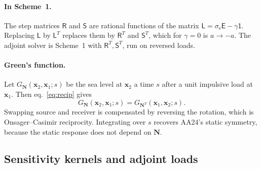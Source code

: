 \documentclass[11pt,a4paper]{article}
\newcommand{\bx}{\mathbf{x}}
\newcommand{\bN}{\mathbf{N}}
\newcommand{\E}{\mathsf{E}}
\newcommand{\Id}{\mathsf{1}}
\newcommand{\R}{\mathsf{R}}
\newcommand{\Sm}{\mathsf{S}}
\newcommand{\se}{\sigma_{\mathrm e}}
\begin{document}
\paragraph{In Scheme~1.} The step matrices $\R$ and $\Sm$ are rational functions of the matrix
$\mathsf{L}=\se\E-\gamma\Id$. Replacing $\mathsf{L}$ by $\mathsf{L}^T$ replaces them by $\R^T$ and
$\Sm^T$, which for $\gamma=0$ is $a\to-a$. The adjoint solver is Scheme~1 with $\R^T,\Sm^T$, run on
reversed loads.

\paragraph{Green's function.} Let $G_{\bN}(\bx_2,\bx_1;s)$ be the sea level at $\bx_2$ a time $s$ after
a unit impulsive load at $\bx_1$. Then eq.~\eqref{eq:recip} gives
\begin{equation}
  G_{\bN}(\bx_2,\bx_1;s)=G_{\bN^T}(\bx_1,\bx_2;s).
  \label{eq:green}
\end{equation}
Swapping source and receiver is compensated by reversing the rotation, which is Onsager--Casimir
reciprocity. Integrating over $s$ recovers AA24's static symmetry, because the static response does
not depend on $\bN$.

\subsection{Sensitivity kernels and adjoint loads}
\label{sec:kernels}
\end{document}
